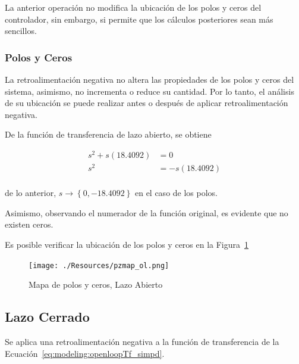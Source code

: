 \documentclass[12pt,a4paper]{article}
\begin{document}
        La anterior operación no modifica la ubicación de los polos y ceros del controlador, sin embargo, 
        si permite que los cálculos posteriores sean más sencillos. 

        \subsubsection{Polos y Ceros}

        La retroalimentación negativa no altera las propiedades de los polos y ceros del sistema, asimismo, no 
        incrementa o reduce su cantidad. Por lo tanto, el análisis de su ubicación se puede realizar antes o después de
        aplicar retroalimentación negativa. 

        De la función de transferencia de lazo abierto, se obtiene

          \begin{equation*}
            \begin{aligned}
              s^{2}+ s\left(18.4092\right) &= 0 \\
              s^{2} &= -s\left(18.4092\right)\\
            \end{aligned}
            \label{eq*:modeling:roots}
          \end{equation*}    

          de lo anterior, \(s \rightarrow \left\{0, -18.4092\right\}\) en el caso de los polos. 

          Asimismo, observando el numerador de la función original, es evidente que no existen ceros. 

          Es posible verificar la ubicación de los polos y ceros en la Figura~\ref{fig:modeling:pzmap_open}

          \begin{figure}
            \centering
            \texttt{[image: ./Resources/pzmap\_ol.png]}
            \caption{Mapa de polos y ceros, Lazo Abierto}
            \label{fig:modeling:pzmap_open}
          \end{figure}

      \subsection{Lazo Cerrado}    
      
        Se aplica una retroalimentación negativa a la función de transferencia de la Ecuación~\ref{eq:modeling:openloopTf_simpd}.
\end{document}
